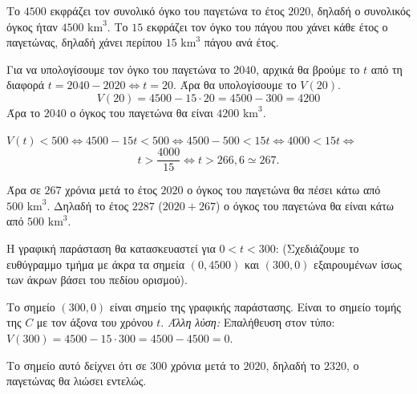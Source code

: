 
\begin{alist}
\item Το $4500$ εκφράζει τον συνολικό όγκο του παγετώνα το έτος $2020$, δηλαδή ο συνολικός όγκος ήταν $4500\text{ km}^3$. Το $15$ εκφράζει τον όγκο του πάγου που χάνει κάθε έτος ο παγετώνας, δηλαδή χάνει περίπου $15\text{ km}^3$ πάγου ανά έτος.

\item Για να υπολογίσουμε τον όγκο του παγετώνα το $2040$, αρχικά θα βρούμε το $t$ από τη διαφορά $t = 2040 - 2020 \Leftrightarrow t = 20$. Άρα θα υπολογίσουμε το $V(20)$.
\[V(20) = 4500 - 15 \cdot 20 = 4500 - 300 = 4200\]
Άρα το $2040$ ο όγκος του παγετώνα θα είναι $4200\text{ km}^3$.

\item $V(t) < 500 \Leftrightarrow 4500 - 15t < 500 \Leftrightarrow 4500 - 500 < 15t \Leftrightarrow 4000 < 15t \Leftrightarrow$
\[t > \dfrac{4000}{15} \Leftrightarrow t > 266,6 \simeq 267.\]

Άρα σε $267$ χρόνια μετά το έτος $2020$ ο όγκος του παγετώνα θα πέσει κάτω από $500\text{ km}^3$.
Δηλαδή το έτος $2287$ ($2020+267$) ο όγκος του παγετώνα θα είναι κάτω από $500\text{ km}^3$.

\item
\begin{rlist}
\item Η γραφική παράσταση θα κατασκευαστεί για $0 < t < 300$:
(Σχεδιάζουμε το ευθύγραμμο τμήμα με άκρα τα σημεία $(0, 4500)$ και $(300, 0)$ εξαιρουμένων ίσως των άκρων βάσει του πεδίου ορισμού).
\item Το σημείο $(300,0)$ είναι σημείο της γραφικής παράστασης. Είναι το σημείο τομής της $C$ με τον άξονα του χρόνου $t$.
\textit{Άλλη λύση:}
Επαλήθευση στον τύπο: $V(300) = 4500 - 15 \cdot 300 = 4500 - 4500 = 0$.
\item Το σημείο αυτό δείχνει ότι σε $300$ χρόνια μετά το $2020$, δηλαδή το $2320$, ο παγετώνας θα λιώσει εντελώς.
\end{rlist}
\end{alist}

